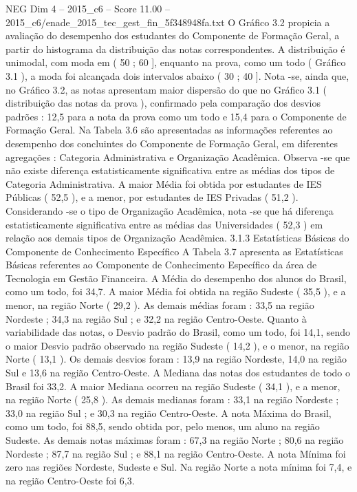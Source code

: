 \begin{textsample}{NEG Dim 4 – 2015\_c6 – Score 11.00 – 2015\_c6/enade\_2015\_tec\_gest\_fin\_5f348948fa.txt}
O Gráfico 3.2 propicia a avaliação do desempenho dos estudantes do Componente de Formação Geral, a partir do histograma da distribuição das notas correspondentes.
A distribuição é unimodal, com moda em ( 50 ; 60 ], enquanto na prova, como um todo ( Gráfico 3.1 ), a moda foi alcançada dois intervalos abaixo ( 30 ; 40 ].
Nota -se, ainda que, no Gráfico 3.2, as notas apresentam maior dispersão do que no Gráfico 3.1 ( distribuição das notas da prova ), confirmado pela comparação dos desvios padrões : 12,5 para a nota da prova como um todo e 15,4 para o Componente de Formação Geral.
Na Tabela 3.6 são apresentadas as informações referentes ao desempenho dos concluintes do Componente de Formação Geral, em diferentes agregações : Categoria Administrativa e Organização Acadêmica.
Observa -se que não existe diferença estatisticamente significativa entre as médias dos tipos de Categoria Administrativa.
A maior Média foi obtida por estudantes de IES Públicas ( 52,5 ), e a menor, por estudantes de IES Privadas ( 51,2 ).
Considerando -se o tipo de Organização Acadêmica, nota -se que há diferença estatisticamente significativa entre as médias das Universidades ( 52,3 ) em relação aos demais tipos de Organização Acadêmica. 3.1.3 Estatísticas Básicas do Componente de Conhecimento Específico A Tabela 3.7 apresenta as Estatísticas Básicas referentes ao Componente de Conhecimento Específico da área de Tecnologia em Gestão Financeira.
A Média do desempenho dos alunos do Brasil, como um todo, foi 34,7.
A maior Média foi obtida na região Sudeste ( 35,5 ), e a menor, na região Norte ( 29,2 ).
As demais médias foram : 33,5 na região Nordeste ; 34,3 na região Sul ; e 32,2 na região Centro-Oeste.
Quanto à variabilidade das notas, o Desvio padrão do Brasil, como um todo, foi 14,1, sendo o maior Desvio padrão observado na região Sudeste ( 14,2 ), e o menor, na região Norte ( 13,1 ).
Os demais desvios foram : 13,9 na região Nordeste, 14,0 na região Sul e 13,6 na região Centro-Oeste.
A Mediana das notas dos estudantes de todo o Brasil foi 33,2.
A maior Mediana ocorreu na região Sudeste ( 34,1 ), e a menor, na região Norte ( 25,8 ).
As demais medianas foram : 33,1 na região Nordeste ; 33,0 na região Sul ; e 30,3 na região Centro-Oeste.
A nota Máxima do Brasil, como um todo, foi 88,5, sendo obtida por, pelo menos, um aluno na região Sudeste.
As demais notas máximas foram : 67,3 na região Norte ; 80,6 na região Nordeste ; 87,7 na região Sul ; e 88,1 na região Centro-Oeste.
A nota Mínima foi zero nas regiões Nordeste, Sudeste e Sul.
Na região Norte a nota mínima foi 7,4, e na região Centro-Oeste foi 6,3.

\end{textsample}
